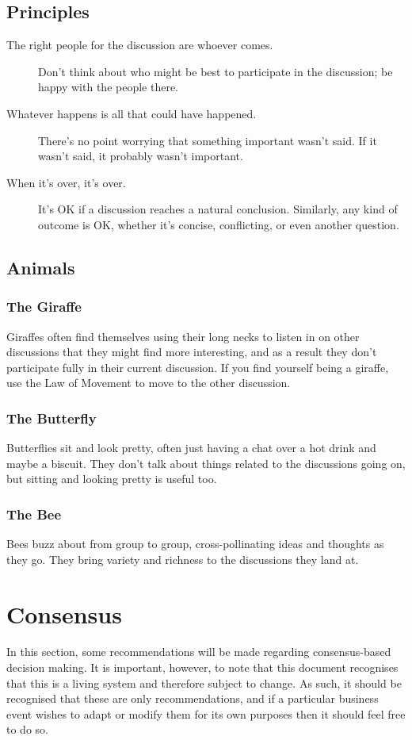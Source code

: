 \documentclass[a4paper, 11pt]{article} %
\begin{document}
\subsection{Principles}
\begin{description}
\item[The right people for the discussion are whoever comes.]  Don't think about who might be best to participate in the discussion; be happy with the people there.
\item[Whatever happens is all that could have happened.]  There's no point worrying that something important wasn't said.  If it wasn't said, it probably wasn't important.
\item[When it's over, it's over.]  It's OK if a discussion reaches a natural conclusion.  Similarly, any kind of outcome is OK, whether it's concise, conflicting, or even another question.
\end{description}

\subsection{Animals}
\subsubsection{The Giraffe}
Giraffes often find themselves using their long necks to listen in on other discussions that they might find more interesting, and as a result they don't participate fully in their current discussion.  If you find yourself being a giraffe, use the Law of Movement to move to the other discussion.

\subsubsection{The Butterfly}
Butterflies sit and look pretty, often just having a chat over a hot drink and maybe a biscuit.  They don't talk about things related to the discussions going on, but sitting and looking pretty is useful too.

\subsubsection{The Bee}
Bees buzz about from group to group, cross-pollinating ideas and thoughts as they go.  They bring variety and richness to the discussions they land at.

\section{Consensus}
\label{sec:consensus}
In this section, some recommendations will be made regarding consensus-based decision making.  It is important, however, to note that this document recognises that this is a living system and therefore subject to change.  As such, it should be recognised that these are only recommendations, and if a particular business event wishes to adapt or modify them for its own purposes then it should feel free to do so.
\end{document}
